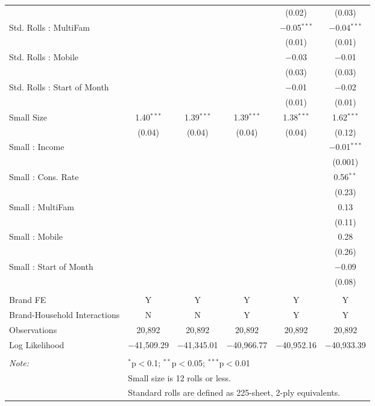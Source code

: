 \begin{table}[!htbp]
\begin{tabular}{@{\extracolsep{5pt}}lccccc}
  &  &  &  & (0.02) & (0.03) \\ 
  Std. Rolls : MultiFam &  &  &  & $-$0.05$^{***}$ & $-$0.04$^{***}$ \\ 
  &  &  &  & (0.01) & (0.01) \\ 
  Std. Rolls : Mobile &  &  &  & $-$0.03 & $-$0.01 \\ 
  &  &  &  & (0.03) & (0.03) \\ 
  Std. Rolls : Start of Month &  &  &  & $-$0.01 & $-$0.02 \\ 
  &  &  &  & (0.01) & (0.01) \\ 
  Small Size & 1.40$^{***}$ & 1.39$^{***}$ & 1.39$^{***}$ & 1.38$^{***}$ & 1.62$^{***}$ \\ 
  & (0.04) & (0.04) & (0.04) & (0.04) & (0.12) \\ 
  Small : Income &  &  &  &  & $-$0.01$^{***}$ \\ 
  &  &  &  &  & (0.001) \\ 
  Small : Cons. Rate &  &  &  &  & 0.56$^{**}$ \\ 
  &  &  &  &  & (0.23) \\ 
  Small : MultiFam &  &  &  &  & 0.13 \\ 
  &  &  &  &  & (0.11) \\ 
  Small : Mobile &  &  &  &  & 0.28 \\ 
  &  &  &  &  & (0.26) \\ 
  Small : Start of Month &  &  &  &  & $-$0.09 \\ 
  &  &  &  &  & (0.08) \\ 
 \hline \\[-1.8ex] 
Brand FE & Y & Y & Y & Y & Y \\ 
Brand-Household Interactions & N & N & Y & Y & Y \\ 
Observations & 20,892 & 20,892 & 20,892 & 20,892 & 20,892 \\ 
Log Likelihood & $-$41,509.29 & $-$41,345.01 & $-$40,966.77 & $-$40,952.16 & $-$40,933.39 \\ 
\hline 
\hline \\[-1.8ex] 
\textit{Note:}  & \multicolumn{5}{l}{$^{*}$p$<$0.1; $^{**}$p$<$0.05; $^{***}$p$<$0.01} \\ 
 & \multicolumn{5}{l}{Small size is 12 rolls or less.} \\ 
 & \multicolumn{5}{l}{Standard rolls are defined as 225-sheet, 2-ply equivalents.} \\ 
\end{tabular} 
\end{table} 
